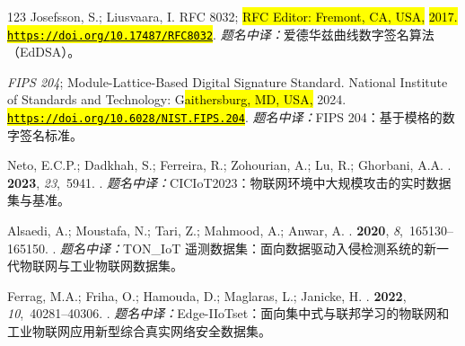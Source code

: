 \begin{thebibliography}{123}
Josefsson, S.; Liusvaara, I.
  RFC 8032; \hl{RFC Editor: Fremont, CA, USA,} \hl{2017.} \newblock \href{https://doi.org/10.17487/RFC8032}{\hl{\mbox{\nolinkurl{https://doi.org/}}}}\allowbreak\href{https://doi.org/10.17487/RFC8032}{\hl{\mbox{\nolinkurl{10.17487/}}}}\allowbreak\href{https://doi.org/10.17487/RFC8032}{\hl{\mbox{\nolinkurl{RFC8032}}}}.
\newblock \textit{题名中译：}爱德华兹曲线数字签名算法（EdDSA）。

\newblock \emph{FIPS 204}; {Module-Lattice-Based Digital Signature Standard.} National Institute of Standards and Technology: G\hl{aithersburg, MD, USA,} 2024.
\newblock \href{https://doi.org/10.6028/NIST.FIPS.204}{\hl{\mbox{\nolinkurl{https://doi.org/}}}}\allowbreak\href{https://doi.org/10.6028/NIST.FIPS.204}{\hl{\mbox{\nolinkurl{10.6028/}}}}\allowbreak\href{https://doi.org/10.6028/NIST.FIPS.204}{\hl{\mbox{\nolinkurl{NIST.FIPS.204}}}}.
\newblock \textit{题名中译：}FIPS 204：基于模格的数字签名标准。

Neto, E.C.P.; Dadkhah, S.; Ferreira, R.; Zohourian, A.; Lu, R.; Ghorbani, A.A.
.
 {\bf 2023}, {\em 23},~5941.
.
\newblock \textit{题名中译：}CICIoT2023：物联网环境中大规模攻击的实时数据集与基准。

Alsaedi, A.; Moustafa, N.; Tari, Z.; Mahmood, A.; Anwar, A.
.
 {\bf 2020}, {\em 8},~165130--165150.
.
\newblock \textit{题名中译：}TON\_IoT 遥测数据集：面向数据驱动入侵检测系统的新一代物联网与工业物联网数据集。

Ferrag, M.A.; Friha, O.; Hamouda, D.; Maglaras, L.; Janicke, H.
.
 {\bf 2022}, {\em 10},~40281--40306.
.
\newblock \textit{题名中译：}Edge-IIoTset：面向集中式与联邦学习的物联网和工业物联网应用新型综合真实网络安全数据集。


\end{thebibliography}
